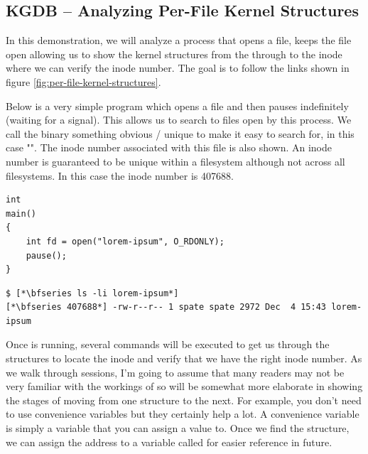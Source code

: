 
\subsection{KGDB -- Analyzing Per-File Kernel Structures}\label{fd-analyze}

In this demonstration, we will analyze a process that opens a file, keeps the file open allowing us to show the kernel structures from the  through to the inode where we can verify the inode number. The goal is to follow the links shown in figure \ref{fig:per-file-kernel-structures}.

Below is a very simple program which opens a file and then pauses indefinitely (waiting for a signal). This allows us to search to files open by this process. We call the binary something obvious / unique to make it easy to search for, in this case "". The inode number associated with this file is also shown. An inode number is guaranteed to be unique within a filesystem although not across all filesystems. In this case the inode number is 407688.

\begin{lstlisting}
int
main()
{
    int fd = open("lorem-ipsum", O_RDONLY);
    pause();
}
\end{lstlisting}

\noindent

\begin{lstlisting}
$ [*\bfseries ls -li lorem-ipsum*]
[*\bfseries 407688*] -rw-r--r-- 1 spate spate 2972 Dec  4 15:43 lorem-ipsum
\end{lstlisting}

\noindent
Once  is running, several  commands will be executed to get us through the structures to locate the inode and verify that we have the right inode number. As we walk through  sessions, I'm going to assume that many readers may not be very familiar with the workings of  so will be somewhat more elaborate in showing the stages of moving from one structure to the next. For example, you don't need to use convenience variables but they certainly help a lot. A convenience variable is simply a variable that you can assign a value to. Once we find the  structure, we can assign the address to a variable called  for easier reference in future.

